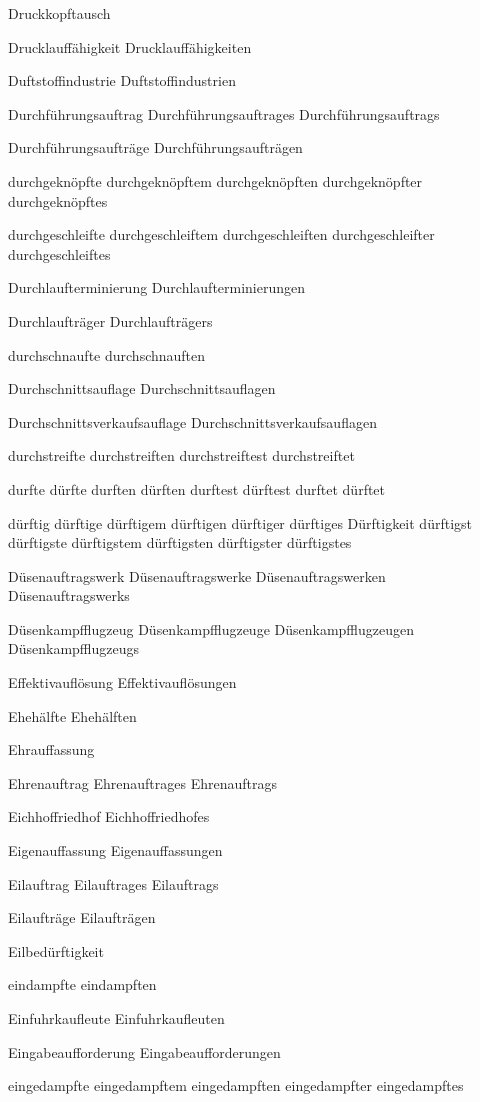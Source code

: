 Druckkopftausch

Drucklauffähigkeit
Drucklauffähigkeiten

Duftstoffindustrie
Duftstoffindustrien

Durchführungsauftrag
Durchführungsauftrages
Durchführungsauftrags

Durchführungsaufträge
Durchführungsaufträgen

durchgeknöpfte
durchgeknöpftem
durchgeknöpften
durchgeknöpfter
durchgeknöpftes

durchgeschleifte
durchgeschleiftem
durchgeschleiften
durchgeschleifter
durchgeschleiftes

Durchlaufterminierung
Durchlaufterminierungen

Durchlaufträger
Durchlaufträgers

durchschnaufte
durchschnauften

Durchschnittsauflage
Durchschnittsauflagen

Durchschnittsverkaufsauflage
Durchschnittsverkaufsauflagen

durchstreifte
durchstreiften
durchstreiftest
durchstreiftet

durfte
dürfte
durften
dürften
durftest
dürftest
durftet
dürftet

dürftig
dürftige
dürftigem
dürftigen
dürftiger
dürftiges
Dürftigkeit
dürftigst
dürftigste
dürftigstem
dürftigsten
dürftigster
dürftigstes

Düsenauftragswerk
Düsenauftragswerke
Düsenauftragswerken
Düsenauftragswerks

Düsenkampfflugzeug
Düsenkampfflugzeuge
Düsenkampfflugzeugen
Düsenkampfflugzeugs

Effektivauflösung
Effektivauflösungen

Ehehälfte
Ehehälften

Ehrauffassung

Ehrenauftrag
Ehrenauftrages
Ehrenauftrags

Eichhoffriedhof
Eichhoffriedhofes

Eigenauffassung
Eigenauffassungen

Eilauftrag
Eilauftrages
Eilauftrags

Eilaufträge
Eilaufträgen

Eilbedürftigkeit

eindampfte
eindampften

Einfuhrkaufleute
Einfuhrkaufleuten

Eingabeaufforderung
Eingabeaufforderungen

eingedampfte
eingedampftem
eingedampften
eingedampfter
eingedampftes

